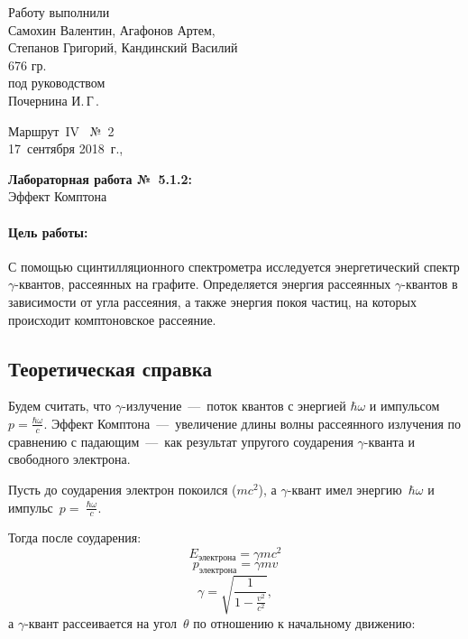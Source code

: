 \documentclass[12pt]{article}
\begin{document}
\begin{minipage}{0.6\linewidth}
	Работу выполнили\\
	Самохин Валентин,
	Агафонов Артем, \\
	Степанов Григорий, Кандинский Василий \\ 676 гр.\\[2mm]
	под руководством\\
	Почернина И.\,Г\,.
\end{minipage}
\hfill
\begin{minipage}{0.3\linewidth}\flushright
	Маршрут~IV \ №~2\\[3mm]
	17~сентября 2018~г.,\\
\end{minipage}

\vspace{8mm}
\begin{center}
	\textbf{\Large Лабораторная работа №~5.1.2:}\\[\parskip]
	\LARGE Эффект Комптона
\end{center}
\vspace{0mm}

\paragraph{Цель работы:} С помощью сцинтилляционного спектрометра исследуется энергетический спектр $\gamma$-квантов, рассеянных на графите. Определяется энергия рассеянных $\gamma$-квантов в зависимости от угла рассеяния, а также энергия покоя частиц, на которых происходит комптоновское рассеяние.

\subsection*{Теоретическая справка}
Будем считать, что $\gamma$-излучение~---~поток квантов с энергией $\hbar\omega$ и импульсом $p=\frac{\hbar\omega}{c}$. Эффект Комптона~---~увеличение длины волны рассеянного излучения по сравнению с падающим~---~как результат упругого соударения  $\gamma$-кванта и свободного электрона.
	
Пусть до соударения электрон покоился ($mc^2$), а  $\gamma$-квант имел энергию~$\hbar\omega$ и импульс~$p=~\frac{\hbar\omega}{c}$.

Тогда после соударения:
\[ E_\text{электрона}=\gamma mc^2 \]
\[ p_\text{электрона}=\gamma mv \]
\[ \gamma=\sqrt{\dfrac{1}{1-\frac{v^2}{c^2}}}, \]
а  $\gamma$-квант рассеивается на угол~$\theta$ по отношению к начальному движению:
\end{document}
